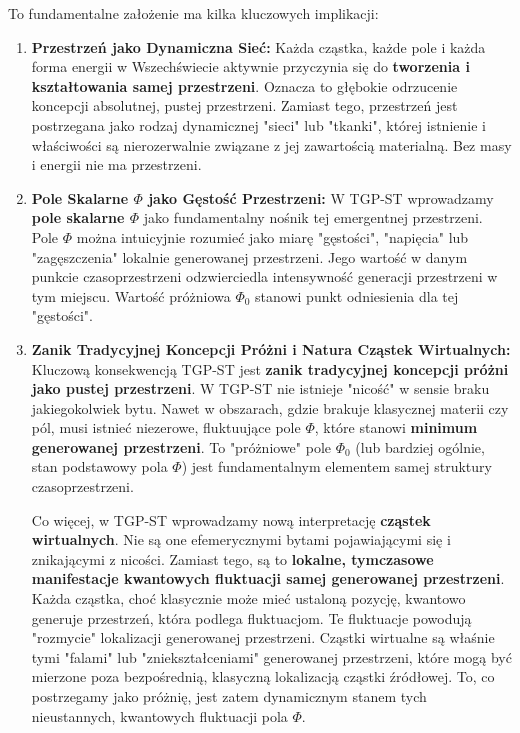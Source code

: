 \documentclass[11pt,a4paper]{article}
\begin{document}
To fundamentalne założenie ma kilka kluczowych implikacji:

\begin{enumerate}
    \item \textbf{Przestrzeń jako Dynamiczna Sieć:} Każda cząstka, każde pole i każda forma energii w Wszechświecie aktywnie przyczynia się do \textbf{tworzenia i kształtowania samej przestrzeni}. Oznacza to głębokie odrzucenie koncepcji absolutnej, pustej przestrzeni. Zamiast tego, przestrzeń jest postrzegana jako rodzaj dynamicznej "sieci" lub "tkanki", której istnienie i właściwości są nierozerwalnie związane z jej zawartością materialną. Bez masy i energii nie ma przestrzeni.
    
    \item \textbf{Pole Skalarne $\Phi$ jako Gęstość Przestrzeni:} W TGP-ST wprowadzamy \textbf{pole skalarne $\Phi$} jako fundamentalny nośnik tej emergentnej przestrzeni. Pole $\Phi$ można intuicyjnie rozumieć jako miarę "gęstości", "napięcia" lub "zagęszczenia" lokalnie generowanej przestrzeni. Jego wartość w danym punkcie czasoprzestrzeni odzwierciedla intensywność generacji przestrzeni w tym miejscu. Wartość próżniowa $\Phi_0$ stanowi punkt odniesienia dla tej "gęstości".

    \item \textbf{Zanik Tradycyjnej Koncepcji Próżni i Natura Cząstek Wirtualnych:}
    Kluczową konsekwencją TGP-ST jest \textbf{zanik tradycyjnej koncepcji próżni jako pustej przestrzeni}. W TGP-ST nie istnieje "nicość" w sensie braku jakiegokolwiek bytu. Nawet w obszarach, gdzie brakuje klasycznej materii czy pól, musi istnieć niezerowe, fluktuujące pole $\Phi$, które stanowi \textbf{minimum generowanej przestrzeni}. To "próżniowe" pole $\Phi_0$ (lub bardziej ogólnie, stan podstawowy pola $\Phi$) jest fundamentalnym elementem samej struktury czasoprzestrzeni.

    Co więcej, w TGP-ST wprowadzamy nową interpretację \textbf{cząstek wirtualnych}. Nie są one efemerycznymi bytami pojawiającymi się i znikającymi z nicości. Zamiast tego, są to \textbf{lokalne, tymczasowe manifestacje kwantowych fluktuacji samej generowanej przestrzeni}. Każda cząstka, choć klasycznie może mieć ustaloną pozycję, kwantowo generuje przestrzeń, która podlega fluktuacjom. Te fluktuacje powodują "rozmycie" lokalizacji generowanej przestrzeni. Cząstki wirtualne są właśnie tymi "falami" lub "zniekształceniami" generowanej przestrzeni, które mogą być mierzone poza bezpośrednią, klasyczną lokalizacją cząstki źródłowej. To, co postrzegamy jako próżnię, jest zatem dynamicznym stanem tych nieustannych, kwantowych fluktuacji pola $\Phi$.


\end{enumerate}
\end{document}
